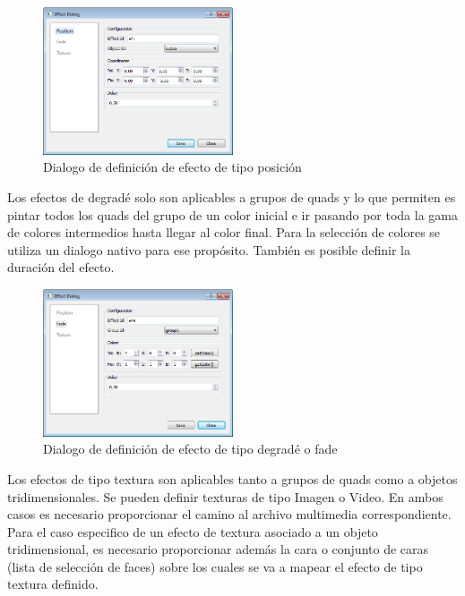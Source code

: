 \begin{figure}[H]
  \centering
    \includegraphics[width=0.5\textwidth]{./Cap5_vmt/vmt_EfectDialog1.png}
  \caption{Dialogo de definición de efecto de tipo posición}
  \label{fig:VMT-EffectPossition}
\end{figure}

Los efectos de degradé solo son aplicables a grupos de quads y lo que permiten es pintar todos los quads del grupo de un color inicial e ir pasando por toda la gama de colores intermedios hasta llegar al color final. Para la selección de colores se utiliza un dialogo nativo para ese propósito. También es posible definir la duración del efecto.

\begin{figure}[H]
  \centering
    \includegraphics[width=0.5\textwidth]{./Cap5_vmt/vmt_EfectDialog2.png}
  \caption{Dialogo de definición de efecto de tipo degradé o fade}
  \label{fig:VMT-EffectFade}
\end{figure}

Los efectos de tipo textura son aplicables tanto a grupos de quads como a objetos tridimensionales. Se pueden definir texturas de tipo Imagen o Video. En ambos casos es necesario proporcionar el camino al archivo multimedia correspondiente. Para el caso especifico de un efecto de textura asociado a un objeto tridimensional, es necesario proporcionar además la cara o conjunto de caras (lista de selección de faces) sobre los cuales se va a mapear el efecto de tipo textura definido.

